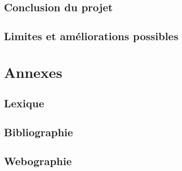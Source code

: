 \documentclass[10pt, a4paper]{report}
\begin{document}
	\section{Conclusion du projet}
	\section{Limites et améliorations possibles}
	
	\appendix
	\chapter{Annexes}
	\section{Lexique}
	\section{Bibliographie}
	\section{Webographie}
	
	
	
		
	
	\nocite{*}
	
	
	
	\clearpage
	
	\printglossaries
	
	
\end{document}
